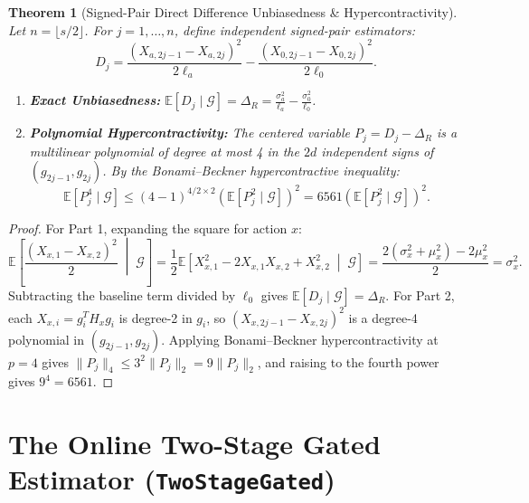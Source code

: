\documentclass[11pt,letterpaper]{article}
\newtheorem{theorem}{Theorem}
\begin{document}
\begin{theorem}[Signed-Pair Direct Difference Unbiasedness \& Hypercontractivity]
\label{thm:signed_pair}
Let $n = \lfloor s/2 \rfloor$. For $j = 1, \dots, n$, define independent signed-pair estimators:
\begin{equation}
D_j = \frac{(X_{a, 2j-1} - X_{a, 2j})^2}{2\ell_a} - \frac{(X_{0, 2j-1} - X_{0, 2j})^2}{2\ell_0}.
\end{equation}
\begin{enumerate}
    \item \textbf{Exact Unbiasedness:} $\mathbb{E}[D_j \mid \mathcal{G}] = \Delta_R = \frac{\sigma_a^2}{\ell_a} - \frac{\sigma_0^2}{\ell_0}$.
    \item \textbf{Polynomial Hypercontractivity:} The centered variable $P_j = D_j - \Delta_R$ is a multilinear polynomial of degree at most 4 in the $2d$ independent signs of $(g_{2j-1}, g_{2j})$. By the Bonami--Beckner hypercontractive inequality:
    \begin{equation}
    \mathbb{E}[P_j^4 \mid \mathcal{G}] \le (4-1)^{4/2 \times 2} (\mathbb{E}[P_j^2 \mid \mathcal{G}])^2 = 6561 (\mathbb{E}[P_j^2 \mid \mathcal{G}])^2.
    \end{equation}
\end{enumerate}
\end{theorem}

\begin{proof}
For Part 1, expanding the square for action $x$:
\begin{equation}
\mathbb{E}\left[ \frac{(X_{x,1} - X_{x,2})^2}{2} \;\middle|\; \mathcal{G} \right] = \frac{1}{2} \mathbb{E}\left[ X_{x,1}^2 - 2X_{x,1}X_{x,2} + X_{x,2}^2 \;\middle|\; \mathcal{G} \right] = \frac{2(\sigma_x^2 + \mu_x^2) - 2\mu_x^2}{2} = \sigma_x^2.
\end{equation}
Subtracting the baseline term divided by $\ell_0$ gives $\mathbb{E}[D_j \mid \mathcal{G}] = \Delta_R$.
For Part 2, each $X_{x,i} = g_i^T H_x g_i$ is degree-2 in $g_i$, so $(X_{x,2j-1} - X_{x,2j})^2$ is a degree-4 polynomial in $(g_{2j-1}, g_{2j})$. Applying Bonami--Beckner hypercontractivity at $p=4$ gives $\|P_j\|_4 \le 3^2 \|P_j\|_2 = 9 \|P_j\|_2$, and raising to the fourth power gives $9^4 = 6561$.
\end{proof}

\newpage

\section{The Online Two-Stage Gated Estimator (\texttt{TwoStageGated})}
\end{document}
